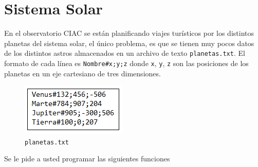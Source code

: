 \section{Sistema Solar}

En el observatorio CIAC se están planificando viajes turísticos por los distintos planetas del sistema solar, el único problema, es que se tienen muy pocos datos de los distintos astros almacenados en un archivo de texto \texttt{planetas.txt}. El formato de cada línea es \texttt{Nombre\#x;y;z} donde \texttt{x}, \texttt{y}, \texttt{z} son las posiciones de los planetas en un eje cartesiano de tres dimensiones.

\begin{figure}[h]
    \centering
    \includegraphics{Imagenes/planetas.png}
    \caption{\texttt{planetas.txt} }
\end{figure}

Se le pide a usted programar las siguientes funciones

